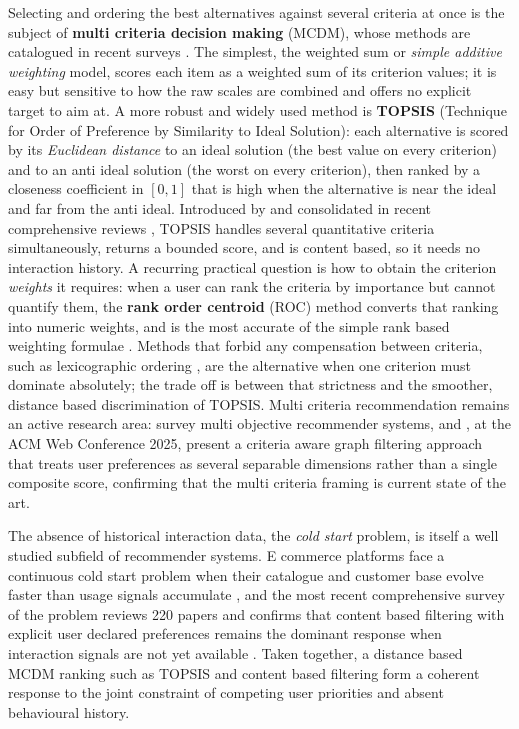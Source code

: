 Selecting and ordering the best alternatives against several criteria at once is the subject of \textbf{multi criteria decision making} (MCDM), whose methods are catalogued in recent surveys \parencite{TaherdoostMadanchian2023}. The simplest, the weighted sum or \emph{simple additive weighting} model, scores each item as a weighted sum of its criterion values; it is easy but sensitive to how the raw scales are combined and offers no explicit target to aim at. A more robust and widely used method is \textbf{TOPSIS} (Technique for Order of Preference by Similarity to Ideal Solution): each alternative is scored by its \emph{Euclidean distance} to an ideal solution (the best value on every criterion) and to an anti ideal solution (the worst on every criterion), then ranked by a closeness coefficient in $[0,1]$ that is high when the alternative is near the ideal and far from the anti ideal. Introduced by \textcite{HwangYoon1981} and consolidated in recent comprehensive reviews \parencite{TaherdoostMadanchian2023}, TOPSIS handles several quantitative criteria simultaneously, returns a bounded score, and is content based, so it needs no interaction history. A recurring practical question is how to obtain the criterion \emph{weights} it requires: when a user can rank the criteria by importance but cannot quantify them, the \textbf{rank order centroid} (ROC) method converts that ranking into numeric weights, and is the most accurate of the simple rank based weighting formulae \parencite{BarronBarrett1996}. Methods that forbid any compensation between criteria, such as lexicographic ordering \parencite{Fishburn1974, Roberts1979}, are the alternative when one criterion must dominate absolutely; the trade off is between that strictness and the smoother, distance based discrimination of TOPSIS. Multi criteria recommendation remains an active research area: \textcite{JannachAbdollahpouri2023} survey multi objective recommender systems, and \textcite{ParkYooShin2025}, at the ACM Web Conference 2025, present a criteria aware graph filtering approach that treats user preferences as several separable dimensions rather than a single composite score, confirming that the multi criteria framing is current state of the art.

The absence of historical interaction data, the \emph{cold start} problem, is itself a well studied subfield of recommender systems. E commerce platforms face a continuous cold start problem when their catalogue and customer base evolve faster than usage signals accumulate \parencite{BernardiKamps2016}, and the most recent comprehensive survey of the problem reviews 220 papers and confirms that content based filtering with explicit user declared preferences remains the dominant response when interaction signals are not yet available \parencite{ZhangColdStart2025}. Taken together, a distance based MCDM ranking such as TOPSIS and content based filtering form a coherent response to the joint constraint of competing user priorities and absent behavioural history.

